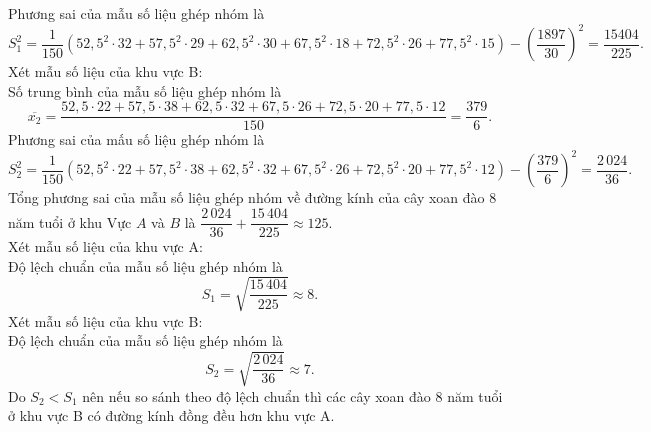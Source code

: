 \begin{ex}
{		Phương sai của mẫu số liệu ghép nhóm là		
		$$S_{1}^{2}=\dfrac{1}{150}\left(52{,}5^{2} \cdot 32+57{,}5^{2} \cdot 29+62{,}5^{2} \cdot 30+67{,}5^{2} \cdot 18+72{,}5^{2} \cdot 26+77{,}5^{2} \cdot 15\right)-\left(\dfrac{1897}{30}\right)^{2}=\dfrac{15404}{225}.$$
		Xét mẫu số liệu của khu vực B:\\		
		Số trung bình của mẫu số liệu ghép nhóm là		
		$$\overline{x_{2}}=\dfrac{52{,}5 \cdot 22+57{,}5\cdot 38+62{,}5 \cdot 32+67{,}5\cdot 26+72{,}5\cdot 20+77{,}5\cdot 12}{150}=\dfrac{379}{6}.$$		
		Phương sai của mấu số liệu ghép nhóm là		
		$$S_{2}^{2}=\dfrac{1}{150}\left(52{,}5^{2} \cdot 22+57{,}5^{2} \cdot 38+62{,}5^{2} \cdot 32+67{,}5^{2} \cdot 26+72{,}5^{2} \cdot 20+77{,}5^{2} \cdot 12\right)-\left(\dfrac{379}{6}\right)^{2}=\dfrac{2\,024}{36}.$$
		Tổng phương sai của mẫu số liệu ghép nhóm về đường kính của cây xoan đào $8$ năm tuổi ở khu Vực $A$ và $B$ là $\dfrac{2\,024}{36}+\dfrac{15\,404}{225} \approx 125$.\\		
		Xét mẫu số liệu của khu vực A:\\
		Độ lệch chuẩn của mẫu số liệu ghép nhóm là
		$$S_{1}=\sqrt{\dfrac{15\,404}{225}} \approx 8.$$		
		Xét mẫu số liệu của khu vực B:\\		
		Độ lệch chuẩn của mẫu số liệu ghép nhóm là
		$$S_{2}=\sqrt{\dfrac{2\,024}{36}} \approx 7.$$		
		Do $S_{2}<S_{1}$ nên nếu so sánh theo độ lệch chuẩn thì các cây xoan đào $8$ năm tuổi ở khu vực B có đường kính đồng đều hơn khu vực A.
	}
\end{ex}

